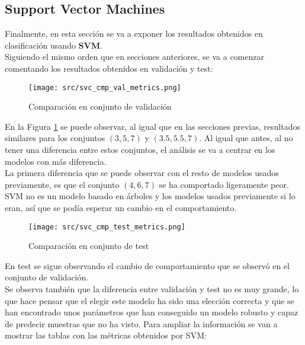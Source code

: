 \subsection{Support Vector Machines}
Finalmente, en esta sección se va a exponer los resultados obtenidos en clasificación usando \textbf{SVM}.\\
\linebreak
Siguiendo el mismo orden que en secciones anteriores, se va a comenzar comentando los resultados obtenidos en validación y test:
\begin{figure}[H]
	\centering
	\texttt{[image: src/svc\_cmp\_val\_metrics.png]}
	\caption{Comparación en conjunto de validación}
	\label{fig:svc_class_cmp_val}
\end{figure}
En la Figura \ref{fig:svc_class_cmp_val} se puede observar, al igual que en las secciones previas, resultados similares para los conjuntos $(3,5,7)$ y $(3.5,5.5,7)$. Al igual que antes, al no tener una diferencia entre estos conjuntos, el análisis se va a centrar en los modelos con más diferencia.\\
La primera diferencia que se puede observar con el resto de modelos usados previamente, es que el conjunto $(4,6,7)$ se ha comportado ligeramente peor. \\
SVM no es un modelo basado en árboles y los modelos usados previamente si lo eran, así que se podía esperar un cambio en el comportamiento.
\begin{figure}[H]
	\centering
	\texttt{[image: src/svc\_cmp\_test\_metrics.png]}
	\caption{Comparación en conjunto de test}
	\label{fig:svc_class_cmp_test}
\end{figure}
En test se sigue observando el cambio de comportamiento que se observó en el conjunto de validación.\\
\linebreak
Se observa también que la diferencia entre validación y test no es muy grande, lo que hace pensar que el elegir este modelo ha sido una elección correcta y que se han encontrado unos parámetros que han conseguido un modelo robusto y capaz de predecir muestras que no ha visto.
\clearpage 
Para ampliar la información se van a mostrar las tablas con las métricas obtenidos por SVM:
